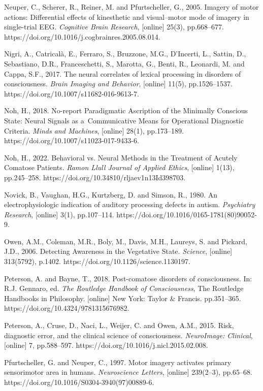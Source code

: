 Neuper, C., Scherer, R., Reiner, M. and Pfurtscheller, G., 2005. Imagery of motor actions: Differential effects of kinesthetic and visual–motor mode of imagery in single-trial EEG. \textit{Cognitive Brain Research}, [online] 25(3), pp.668–677. https://doi.org/10.1016/j.cogbrainres.2005.08.014.

Nigri, A., Catricalà, E., Ferraro, S., Bruzzone, M.G., D'Incerti, L., Sattin, D., Sebastiano, D.R., Franceschetti, S., Marotta, G., Benti, R., Leonardi, M. and Cappa, S.F., 2017. The neural correlates of lexical processing in disorders of consciousness. \textit{Brain Imaging and Behavior}, [online] 11(5), pp.1526–1537. https://doi.org/10.1007/s11682-016-9613-7.

Noh, H., 2018. No-report Paradigmatic Ascription of the Minimally Conscious State: Neural Signals as a~Communicative Means for Operational Diagnostic Criteria. \textit{Minds and Machines}, [online] 28(1), pp.173–189. https://doi.org/10.1007/s11023-017-9433-6.

Noh, H., 2022. Behavioral vs. Neural Methods in the Treatment of Acutely Comatose Patients. \textit{Ramon Llull Journal of Applied Ethics}, [online] 1(13), pp.245–258. https://doi.org/10.34810/rljaev1n13Id398703.

Novick, B., Vaughan, H.G., Kurtzberg, D. and Simson, R., 1980. An electrophysiologic indication of auditory processing defects in autism. \textit{Psychiatry Research}, [online] 3(1), pp.107–114. https://doi.org/10.1016/0165-1781(80)90052-9.

Owen, A.M., Coleman, M.R., Boly, M., Davis, M.H., Laureys, S. and Pickard, J.D., 2006. Detecting Awareness in the Vegetative State. \textit{Science}, [online] 313(5792), p.1402. https://doi.org/10.1126/science.1130197.

Peterson, A. and Bayne, T., 2018. Post-comatose disorders of consciousness. In: R.J. Gennaro, ed. \textit{The Routledge Handbook of Consciousness}, The Routledge Handbooks in Philosophy. [online] New York: Taylor \& Francis. pp.351–365. https://doi.org/10.4324/9781315676982.

Peterson, A., Cruse, D., Naci, L., Weijer, C. and Owen, A.M., 2015. Risk, diagnostic error, and the clinical science of consciousness. \textit{NeuroImage: Clinical}, [online] 7, pp.588–597. https://doi.org/10.1016/j.nicl.2015.02.008.

Pfurtscheller, G. and Neuper, C., 1997. Motor imagery activates primary sensorimotor area in humans. \textit{Neuroscience Letters}, [online] 239(2–3), pp.65–68. https://doi.org/10.1016/S0304-3940(97)00889-6.

